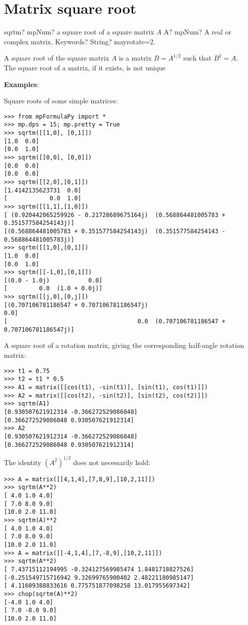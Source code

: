 \newpage
\section{Matrix square root}


\begin{mpFunctionsExtract}
	\mpFunctionTwo
	{sqrtm? mpNum? a square root of a square matrix $A$}
	{A? mpNum? A real or complex matrix.}
	{Keywords? String?  mayrotate=2.}	
\end{mpFunctionsExtract}


\vpara
A square root of the square matrix $A$ is a matrix $B=A^{1/2}$ such that $B^2=A$. The square root of a matrix, if it exists, is not unique

\vpara
\textbf{Examples}:

Square roots of some simple matrices:

\begin{lstlisting}
>>> from mpFormulaPy import *
>>> mp.dps = 15; mp.pretty = True
>>> sqrtm([[1,0], [0,1]])
[1.0  0.0]
[0.0  1.0]
>>> sqrtm([[0,0], [0,0]])
[0.0  0.0]
[0.0  0.0]
>>> sqrtm([[2,0],[0,1]])
[1.4142135623731  0.0]
[            0.0  1.0]
>>> sqrtm([[1,1],[1,0]])
[ (0.920442065259926 - 0.21728689675164j)  (0.568864481005783 + 0.351577584254143j)]
[(0.568864481005783 + 0.351577584254143j)  (0.351577584254143 - 0.568864481005783j)]
>>> sqrtm([[1,0],[0,1]])
[1.0  0.0]
[0.0  1.0]
>>> sqrtm([[-1,0],[0,1]])
[(0.0 - 1.0j)           0.0]
[         0.0  (1.0 + 0.0j)]
>>> sqrtm([[j,0],[0,j]])
[(0.707106781186547 + 0.707106781186547j)                                       0.0]
[                                     0.0  (0.707106781186547 + 0.707106781186547j)]
\end{lstlisting}

A square root of a rotation matrix, giving the corresponding half-angle rotation matrix:

\begin{lstlisting}
>>> t1 = 0.75
>>> t2 = t1 * 0.5
>>> A1 = matrix([[cos(t1), -sin(t1)], [sin(t1), cos(t1)]])
>>> A2 = matrix([[cos(t2), -sin(t2)], [sin(t2), cos(t2)]])
>>> sqrtm(A1)
[0.930507621912314 -0.366272529086048]
[0.366272529086048 0.930507621912314]
>>> A2
[0.930507621912314 -0.366272529086048]
[0.366272529086048 0.930507621912314]
\end{lstlisting}

The identity $(A^2)^{1/2}$ does not necessarily hold:

\begin{lstlisting}
>>> A = matrix([[4,1,4],[7,8,9],[10,2,11]])
>>> sqrtm(A**2)
[ 4.0 1.0 4.0]
[ 7.0 8.0 9.0]
[10.0 2.0 11.0]
>>> sqrtm(A)**2
[ 4.0 1.0 4.0]
[ 7.0 8.0 9.0]
[10.0 2.0 11.0]
>>> A = matrix([[-4,1,4],[7,-8,9],[10,2,11]])
>>> sqrtm(A**2)
[ 7.43715112194995 -0.324127569985474 1.8481718827526]
[-0.251549715716942 9.32699765900402 2.48221180985147]
[ 4.11609388833616 0.775751877098258 13.017955697342]
>>> chop(sqrtm(A)**2)
[-4.0 1.0 4.0]
[ 7.0 -8.0 9.0]
[10.0 2.0 11.0]
\end{lstlisting}

